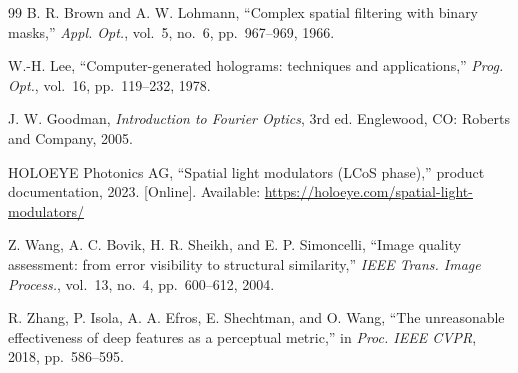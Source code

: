 \documentclass[conference]{IEEEtran}
\begin{document}
\begin{thebibliography}{99}
B. R. Brown and A. W. Lohmann, ``Complex spatial filtering with binary masks,''
\textit{Appl. Opt.}, vol.~5, no.~6, pp.~967--969, 1966.

W.-H. Lee, ``Computer-generated holograms: techniques and applications,''
\textit{Prog. Opt.}, vol.~16, pp.~119--232, 1978.

J. W. Goodman, \textit{Introduction to Fourier Optics}, 3rd ed. Englewood,
CO: Roberts and Company, 2005.

HOLOEYE Photonics AG, ``Spatial light modulators (LCoS phase),'' product
documentation, 2023. [Online]. Available: \url{https://holoeye.com/spatial-light-modulators/}

Z. Wang, A. C. Bovik, H. R. Sheikh, and E. P. Simoncelli, ``Image quality
assessment: from error visibility to structural similarity,''
\textit{IEEE Trans. Image Process.}, vol.~13, no.~4, pp.~600--612, 2004.

R. Zhang, P. Isola, A. A. Efros, E. Shechtman, and O. Wang, ``The unreasonable
effectiveness of deep features as a perceptual metric,'' in
\textit{Proc. IEEE CVPR}, 2018, pp.~586--595.

\end{thebibliography}
\end{document}
